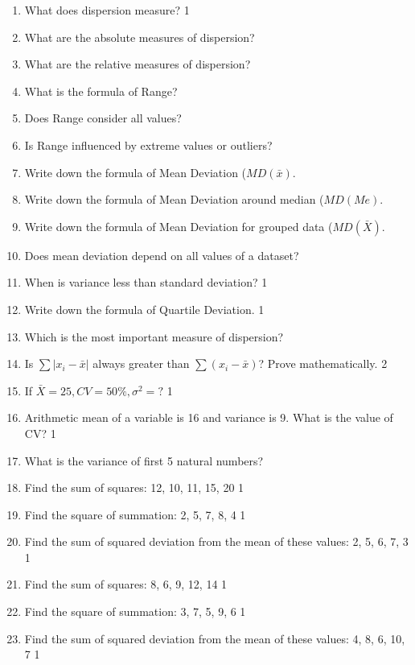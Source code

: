 \documentclass[a4paper,oneside]{book}
\begin{document}
 \begin{enumerate}
 
 \item What does dispersion measure?  \hfill 1
 \item What are the absolute measures of dispersion?
 \item What are the relative measures of dispersion?
 \item What is the formula of Range?
 \item Does Range consider all values?
 \item Is Range influenced by extreme values or outliers?
 \item Write down the formula of Mean Deviation ($MD(\bar x)$.
 \item Write down the formula of Mean Deviation around median ($MD(Me)$.
 \item Write down the formula of Mean Deviation for grouped data ($MD(\bar X)$.
 \item Does mean deviation depend on all values of a dataset?
  \item When is variance less than standard deviation? \hfill 1
  \item Write down the formula of Quartile Deviation. \hfill 1
 \item Which is the most important measure of dispersion?
   \item Is $\sum |x_i-\bar x|$ always greater than $\sum (x_i-\bar x)$? Prove mathematically. \hfill 2
   \item If $\bar X = 25, CV = 50\%, \sigma^2=?$ \hfill 1
   \item Arithmetic mean of a variable is 16 and variance is 9. What is the value of CV? \hfill 1
   \item What is the variance of first 5 natural numbers?
 
 \item Find the sum of squares: 12, 10, 11, 15, 20 \hfill 1
 \item Find the square of summation: 2, 5, 7, 8, 4 \hfill 1
 \item Find the sum of squared deviation from the mean of these values: 2, 5, 6, 7, 3 \hfill 1
 \item Find the sum of squares: 8, 6, 9, 12, 14 \hfill 1  

\item Find the square of summation: 3, 7, 5, 9, 6 \hfill 1  

\item Find the sum of squared deviation from the mean of these values: 4, 8, 6, 10, 7 \hfill 1  


\end{enumerate}
\end{document}
